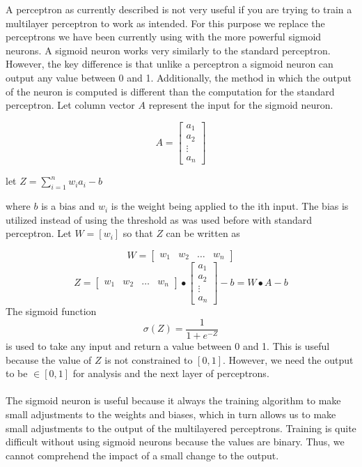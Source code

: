 A perceptron as currently described is not very useful if you are trying to train a multilayer perceptron to work as intended. For this purpose we replace the perceptrons we have been currently using with the more powerful sigmoid neurons. A sigmoid neuron works very similarly to the standard perceptron. However, the key difference is that unlike a perceptron a sigmoid neuron can output any value between 0 and 1. Additionally, the method in which the output of the neuron is computed is different than the computation for the standard perceptron. Let column vector $A$ represent the input for the sigmoid neuron.

$$
	A = 
	\begin{bmatrix}
		a_1 \\
		a_2 \\
		\vdots \\
		a_n
	\end{bmatrix}
$$

\begin{center}
	let $Z = \sum_{i=1}^{n} w_ia_i - b$
\end{center}

where $b$ is a bias and $w_i$ is the weight being applied to the ith input. The bias is utilized instead of using the threshold as was used before with standard perceptron. Let $W=[w_i]$ so that $Z$ can be written as

$$	W=
	 \begin{bmatrix}
		w_1 & w_2 & \dots & w_n
	\end{bmatrix}
$$
$$	
	Z = \begin{bmatrix}
		w_1 & w_2 & \dots & w_n
	\end{bmatrix}	
	\bullet
	\begin{bmatrix}
		a_1 \\ a_2 \\ \vdots \\ a_n	
	\end{bmatrix} - b
	 = W \bullet A - b
$$
The sigmoid function $$\sigma(Z) = \frac{1}{1+e^{-Z}}$$ is used to take any input and return a value between 0 and 1. This is useful because the value of $Z$ is not constrained to $[0, 1]$. However, we need the output to be $\in [0, 1]$ for analysis and the next layer of perceptrons. \\ \\


The sigmoid neuron is useful because it always the training algorithm to make small adjustments to the weights and biases, which in turn allows us to make small adjustments to the output of the multilayered perceptrons. Training is quite difficult without using sigmoid neurons because the values are binary. Thus, we cannot comprehend the impact of a small change to the output. 

